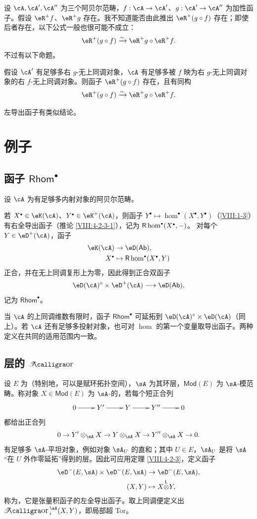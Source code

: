 设 $\cA,\cA',\cA''$ 为三个阿贝尔范畴，$f:\cA\to\cA'$、$g:\cA'\to\cA''$ 为加性函子。假设 $\eR^+f$、$\eR^+g$ 存在。我不知道能否由此推出 $\eR^+(g\circ f)$ 存在；即使后者存在，以下公式一般也很可能不成立：
\[\eR^+(g\circ f)\iso\eR^+g\circ\eR^+f.\]
不过有以下命题。
\begin{proposition}\label{VIII:4-3-1}
假设 $\cA'$ 有足够多右 $g$-无上同调对象，$\cA$ 有足够多被 $f$ 映为右 $g$-无上同调对象的右 $f$-无上同调对象。则函子 $\eR^+(g\circ f)$ 存在，且有同构
\[\eR^+(g\circ f)\iso\eR^+g\circ\eR^+f.\]
\end{proposition}
左导出函子有类似结论。
\section{例子}\label{VIII:6}
\subsection{函子 $\mathsf{Rhom}^\bullet$}\label{VIII:6-1}
设 $\cA$ 为有足够多内射对象的阿贝尔范畴。

若 $X^\bullet\in\eK(\cA)$、$Y^\bullet\in\eK^+(\cA)$，则函子 $Y^\bullet\mapsto\hom^\bullet(X^\bullet,Y^\bullet)$（\ref{VIII:1-3}）有右全导出函子（推论 \ref{VIII:4-2-3-1}），记为 $\rhom^\bullet(X^\bullet,-)$。
对每个 $Y\in\eD^+(\cA)$，函子
\begin{align*}
\eK(\cA)&\to\eD(\mathsf{Ab}),\\
X^\bullet&\mapsto\rhom^\bullet(X^\bullet,Y)
\end{align*}
正合，并在无上同调复形上为零，因此得到正合双函子
\[\eD(\cA)^\circ\times\eD^+(\cA)\longrightarrow\eD(\mathsf{Ab}),\]
记为 $\mathsf{Rhom}^\bullet$。

当 $\cA$ 的上同调维数有限时，函子 $\mathsf{Rhom}^\bullet$ 可延拓到 $\eD(\cA)^\circ\times\eD(\cA)$（同上）。若 $\cA$ 还有足够多投射对象，也可对 $\hom$ 的第一个变量取导出函子。两种定义在共同的适用范围内一致。
\subsection{层的 $\Tor$}\label{VIII:6-2}
设 $E$ 为（特别地，可以是赋环拓扑空间），$\sA$ 为其环层，$\mathsf{Mod}(E)$ 为 $\sA$-模范畴。称对象 $X\in\mathsf{Mod}(E)$ 为 $\sA$-的，若每个短正合列
\[\xymatrix{0\ar[r]&Y'\ar[r]&Y\ar[r]&Y''\ar[r]&0}\]
都给出正合列
\[0\to Y'\otimes_\sA X\to Y\otimes_\sA X\to Y''\otimes_\sA X\to0.\]
有足够多 $\sA$-平坦对象，例如对象 $\sA_U$ 的直和；其中 $U\in E$，$\sA_U$ 是将 $\sA$“在 $U$ 外作零延拓”得到的层。因此可应用定理 \ref{VIII:4-2-3}，定义函子
\begin{align*}
\eD^-(E,\sA)\times\eD^-(E,\sA)&\to\eD^-(E,\sA),\\
(X,Y)&\mapsto X\lotimes Y,
\end{align*}
称为，它是张量积函子的左全导出函子。取上同调便定义出 $\Tor_i^\sA(X,Y)$，即局部超 Tor。

